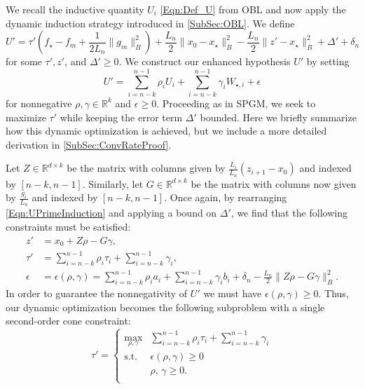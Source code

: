 \documentclass[11pt]{article}
\numberwithin{equation}{section}
\newcommand{\R}{\mathbb{R}}
\newcommand{\Ucoef}{\rho}
\newcommand{\Wcoef}{\gamma}
\newcommand{\idxMem}{k}
\newcommand{\epsFunc}{\epsilon(\Ucoef, \Wcoef)}
\newcommand{\normB}[1]{\|{#1}\|_B}
\newcommand{\ip}[2]{\sum_{i={n-\idxMem}}^{n-1} {#1}_i {#2}_i}
\newcommand{\fullSum}[1]{\sum_{i={n-\idxMem}}^{n-1} {#1}_i}
\theoremstyle{definition}
\theoremstyle{plain}
\theoremstyle{definition}
\begin{document}
We recall the inductive quantity $U_i$ \eqref{Eqn:Def_U} from OBL and now apply the dynamic induction strategy introduced in \cref{SubSec:OBL}. We define
\begin{equation} \label{Eqn:Def_UPrime}
    U' = \tau'\left(f_\star - f_m + \frac{1}{2 L_n}\normB{g_m}^2 \right) + \frac{L_n}{2}\normB{x_0 - x_\star}^2 - \frac{L_n}{2}\normB{z' - x_\star}^2 + \Delta' + \delta_n
\end{equation}
for some $\tau',z'$, and $\Delta' \geq 0$. We construct our enhanced hypothesis $U'$ by setting
\begin{equation} \label{Eqn:UPrimeInduction}
    U' = \sum_{i=n-\idxMem}^{n-1} \Ucoef_i U_i + \sum_{i=n-\idxMem}^{n-1}\Wcoef_i W_{\star,i} + \epsilon
\end{equation}
for nonnegative $\Ucoef, \Wcoef \in \R^k$ and $ \epsilon \geq 0$.
Proceeding as in SPGM, we seek to maximize $\tau'$ while keeping the error term $\Delta'$ bounded. Here we briefly summarize how this dynamic optimization is achieved, but we include a more detailed derivation in \cref{SubSec:ConvRateProof}.

Let $Z \in \R^{d \times \idxMem}$ be the matrix with columns given by $\frac{L_i}{L_n}(z_{i+1}-x_0)$ and indexed by $[n-\idxMem,n-1]$. Similarly, let $G \in \R^{d \times \idxMem}$ be the matrix with columns now given by $\frac{g_i}{L_n}$ and indexed by $[n-\idxMem,n-1]$.
Once again, by rearranging \eqref{Eqn:UPrimeInduction} and applying a bound on $\Delta'$, we find that the following constraints  must be satisfied:
\begin{align}
    z' & = x_0 + Z \Ucoef - G \Wcoef,  \label{Eqn:zPrime} \\ 
    \tau' &= \ip{\Ucoef}{\tau} + \fullSum{\Wcoef}, \\
    \epsilon &= \epsFunc =  \ip{\Ucoef}{a} + \ip{\Wcoef}{b} + \delta_n - \frac{L_n}{2} \normB{Z \Ucoef - G \Wcoef}^2. \label{Eqn:epsFunc}
\end{align}
In order to guarantee the nonnegativity of $U'$ we must have $\epsFunc \geq 0$. Thus, our dynamic optimization becomes the following subproblem with a single second-order cone constraint:
\begin{equation} \label{Eqn:SOCP}
    \tau' = \left\{\begin{array}{ll}
            \max_{\Ucoef, \Wcoef} & \ip{\Ucoef}{\tau} + \fullSum{\Wcoef} \\
            \text{s.t.} & \epsFunc \geq 0 \\
            & \Ucoef, \, \Wcoef \geq 0. \\
            \end{array} \right.
\end{equation}
\end{document}
